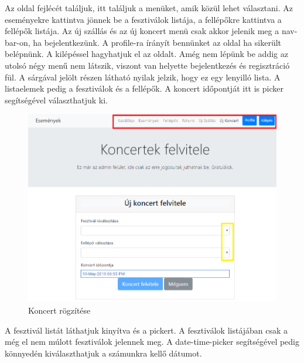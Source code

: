 Az oldal fejlécét találjuk, itt találjuk a menüket, amik közül lehet választani. Az eseményekre kattintva jönnek be a fesztiválok listája, a fellépőkre kattintva a fellépők listája. Az új szállás és az új koncert menü csak akkor jelenik meg a nav-bar-on, ha bejelentkezünk. A profile-ra írányít bennünket az oldal ha sikerült belépnünk. A kilépéssel hagyhatjuk el az oldalt. Amég nem lépünk be addig az utolsó négy menű nem látszik, viszont van helyette bejelentkezés és regisztráció fül. A sárgával jelölt részen látható nyilak jelzik, hogy ez egy lenyilló lista. A listaelemek pedig a fesztiválok és a fellépők. A koncert időpontját itt is picker segítségével választhatjuk ki.  
\begin{figure}
\centering
\includegraphics[scale=0.64]{kepek/concertUp.png}
\caption{Koncert rögzítése}
\label{fig:concert}
\end{figure}
A fesztivál listát láthatjuk kinyítva és a pickert. A fesztiválok listájában csak a még el nem múlott fesztiválok jelennek meg. A date-time-picker segítségével pedig könnyedén kiválaszthatjuk a számunkra kellő dátumot.
